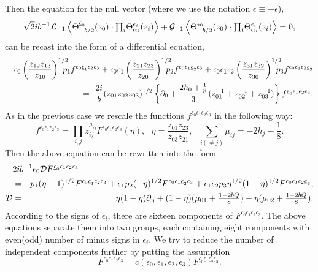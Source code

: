 \documentclass[a4paper,12pt]{article}
\newcommand{\vev}[1]{\left<{#1}\right>}
\newcommand{\tprod}{{\textstyle\prod}}
\newcommand{\tfrac}[2]{{\textstyle\frac{#1}{#2}}}
\newcommand{\ep}{{\epsilon}}
\newcommand{\mep}{{\underline{\epsilon}}}
\begin{document}
 Then the equation for the null vector
 (where we use the notation $\mep\equiv-\ep$),
\begin{eqnarray}
  \sqrt{2}ib^{-1}{\cal L}_{-1}
  \vev{\Theta_{-b/2    }^{\mep_0}(z_0)\cdot\tprod_i
       \Theta_{\alpha_i}^{\ep_i}(z_i)}
  +{\cal G}_{-1}
  \vev{\Theta_{-b/2    }^{\ep_0}(z_0)\cdot\tprod_i
       \Theta_{\alpha_i}^{\ep_i}(z_i)}
 =0,
\end{eqnarray}
 can be recast into the form of a differential equation,
\begin{eqnarray}
&&
  \ep_0\left(\frac{z_{12}z_{13}}{z_{10}}\right)^{1/2}\hskip-3mm
  p_1f^{\ep_0\mep_1\ep_2\ep_3}
 +\ep_0\ep_1\left(\frac{z_{21}z_{23}}{z_{20}}\right)^{1/2}\hskip-3mm
  p_2f^{\ep_0\ep_1\mep_2\ep_3}
 +\ep_0\ep_1\ep_2\left(\frac{z_{31}z_{32}}{z_{30}}\right)^{1/2}\hskip-3mm
  p_3f^{\ep_0\ep_1\ep_2\mep_3}
 \nonumber \\
&& ~=~
  \frac{2i}{b}(z_{01}z_{02}z_{03})^{1/2}\left\{
  \partial_0
 +\frac{2h_0+\frac{1}{8}}{3}
  (z_{01}^{-1}+z_{02}^{-1}+z_{03}^{-1})\right\}
  f^{\mep_0\ep_1\ep_2\ep_3}.
\end{eqnarray}
 As in the previous case we rescale the functions
 $f^{\ep_0\ep_1\ep_2\ep_3}$ in the following way:
\begin{equation}
  f^{\ep_0\ep_1\ep_2\ep_3} = \prod_{i,j}z_{ij}^{\mu_{ij}}
  F^{\ep_0\ep_1\ep_2\ep_3}(\eta),~~~
  \eta = \frac{z_{01}z_{23}}{z_{03}z_{21}},~~~
  \sum_{i(\ne j)}\mu_{ij} = -2h_j-\frac{1}{8}.
\end{equation}
 Then the above equation can be rewritten into the form
\begin{eqnarray}
\lefteqn{ 2ib^{-1}\ep_0{\cal D}F^{\mep_0\ep_1\ep_2\ep_3} }\nonumber \\
&=&p_1(\eta-1)^{1/2}F^{\ep_0\mep_1\ep_2\ep_3}
 + \ep_1p_2(-\eta)^{1/2}F^{\ep_0\ep_1\mep_2\ep_3}
 + \ep_1\ep_2p_3\eta^{1/2}(1-\eta)^{1/2}F^{\ep_0\ep_1\ep_2\mep_3}
 ,\nonumber \\
 {\cal D} &=&
    \eta(1-\eta)\partial_\eta
   +(1-\eta)(\mu_{01}+\tfrac{1-2bQ}{8})
   -\eta(\mu_{02}+\tfrac{1-2bQ}{8}).
\label{nsFe}
\end{eqnarray}
 According to the signs of $\ep_i$, there are sixteen components
 of $F^{\ep_0\ep_1\ep_2\ep_3}$.
 The above equations separate them into two groups, each containing
 eight components with even(odd) number of minus signs in $\ep_i$.
 We try to reduce the number of independent components further
 by putting the assumption
\begin{equation}
  F^{\ep_0\ep_1\ep_2\ep_3}
 = c(\ep_0,\ep_1,\ep_2,\ep_3)F^{\mep_0\mep_1\mep_2\mep_3}.
\end{equation}
\end{document}
